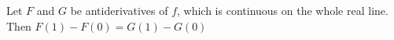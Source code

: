 \documentclass{ximera}
\author{Steven Gubkin}
\begin{document}
\begin{exercise}



Let $F$ and $G$ be antiderivatives of $f$, which is continuous on the whole real line.   Then $F(1)-F(0) = G(1)-G(0)$

	\begin{multipleChoice}	
	\end{multipleChoice}

\end{exercise}
\end{document}

